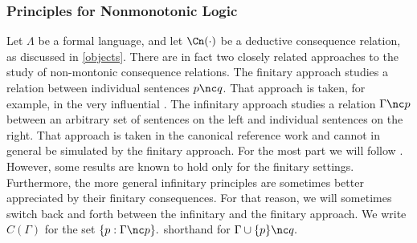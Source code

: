 \subsubsection{Principles for Nonmonotonic Logic }
\label{nonmonprinciples}

Let $\Lambda$ be a formal language, and let $\Cn(\cdot)$ be a deductive
consequence relation, as discussed in \autoref{objects}. There are in fact two
closely related approaches to the study of non-montonic consequence relations.
The finitary approach studies a relation between individual sentences $p \nc q$.
That approach is taken, for example, in the very influential
\citet{kraus1990nonmonotonic}. The infinitary approach studies a relation
$\Gamma \nc p$ between an arbitrary set of sentences on the left and individual
sentences on the right. That approach is taken in the canonical reference work
\citet{makinson1994general} and cannot in general be simulated by the finitary
approach. For the most part we will follow \citet{makinson1994general}. However,
some results are known to hold only for the finitary settings. Furthermore, the
more general infinitary principles are sometimes better appreciated by their
finitary consequences. For that reason, we will  sometimes switch back and forth
between the infinitary and the finitary approach. We write $C(\Gamma)$ for the
set $ \{ p : \Gamma \nc p\}.$ %
shorthand for $\Gamma \cup \{ p \} \nc q.$

